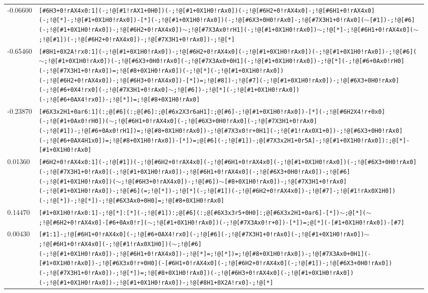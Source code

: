 \begin{longtable}{>{\baselineskip=10pt}p{} >{\baselineskip=10pt}p{}}
-0.06600 & \texttt{[\#6H3+0!rAX4x0:1](-;!@[\#1!rAX1+0H0])(-;!@[\#1+0X1H0!rAx0])(-;!@[\#6H2+0!rAX4x0]-;!@[\#6H1+0!rAX4x0](-;!@[*]-;!@[\#1+0X1H0!rAx0])-[*](-;!@[\#1+0X1H0!rAx0])(-;!@[\#6X3+0H0!rAx0]-;!@[\#7X3H1+0!rAx0]($\sim$[\#1])-;!@[\#6](-;!@[\#1+0X1H0!rAx0])-;!@[\#6H2+0!rAX4x0])$\sim$;!@[\#7X3Ax0!rH1](-;!@[\#1+0X1H0!rAx0])$\sim$;!@[*]-;!@[\#6H1+0!rAX4x0]($\sim$;!@[\#1])(-;!@[\#6H2+0!rAX4x0])-;!@[\#7X3H1+0!rAx0])-;!@[*]} \\ 
-0.65460 & \texttt{[\#8H1+0X2A!rx0:1](-;!@[\#1+0X1H0!rAx0])-;!@[\#6H2+0!rAX4x0](-;!@[\#1+0X1H0!rAx0])(-;!@[\#1+0X1H0!rAx0])-;!@[\#6]($\sim$;!@[\#1+0X1H0!rAx0])(-;!@[\#6X3+0H0!rAx0](-;!@[\#7X3Ax0+0H1](-;!@[\#1+0X1H0!rAx0])-;!@[*](-;!@[\#6+0Ax0!rH0](-;!@[\#7X3H1+0!rAx0])=;!@[\#8+0X1H0!rAx0])(-;!@[*](-;!@[\#1+0X1H0!rAx0])(-;!@[\#6H2+0!rAX4x0])-;!@[\#6H3+0!rAX4x0])-[*])=;!@[\#8])-;!@[\#7](-;!@[\#1+0X1H0!rAx0])-;!@[\#6X3+0H0!rAx0](-;!@[\#6+0X4!rx0](-;!@[\#7X3H1+0!rAx0]$\sim$;!@[\#6])-;!@[*](-;!@[\#1+0X1H0!rAx0])(-;!@[\#6+0AX4!rx0])-;!@[*])=;!@[\#8+0X1H0!rAx0]} \\ 
-0.23870 & \texttt{[\#6X3x2H1+0ar6:1](:;@[\#6](:;@[\#6]:;@[\#6x2X3r6aH1]:;@[\#6]-;!@[\#1+0X1H0!rAx0])-[*](-;!@[\#6H2X4!r+0x0](-;!@[\#1+0Ax0!rH0])($\sim$;!@[\#6H1+0!rAX4x0](-;!@[\#6X3+0H0!rAx0](-;!@[\#7X3H1+0!rAx0](-;!@[\#1])-;!@[\#6+0Ax0!rH1])=;!@[\#8+0X1H0!rAx0])-;!@[\#7X3x0!r+0H1](-;!@[\#1!rAx0X1+0])-;!@[\#6X3+0H0!rAx0](-;!@[\#6+0AX4H1x0])=;!@[\#8+0X1H0!rAx0])-[*])=;@[\#6](-;!@[\#1])-;@[\#7X3x2H1+0r5A]-;!@[\#1+0X1H0!rAx0]):;@[*]-[\#1+0X1H0!rAx0]} \\ 
0.01360 & \texttt{[\#6H2+0!rAX4x0:1](-;!@[\#1])(-;!@[\#6H2+0!rAX4x0](-;!@[\#6H1+0!rAX4x0](-;!@[\#1+0X1H0!rAx0])(-;!@[\#6X3+0H0!rAx0](-;!@[\#7X3H1+0!rAx0](-;!@[\#1+0X1H0!rAx0])-;!@[\#6H1+0!rAX4x0](-;!@[\#6X3+0H0!rAx0])-;!@[\#6](-;!@[\#1+0X1H0!rAx0])($\sim$;!@[\#6H3+0!rAX4x0])-;!@[\#6])$\sim$[\#8+0X1H0!rAx0])-;!@[\#7X3H1+0!rAx0](-;!@[\#1+0X1H0!rAx0])-;!@[\#6](=;!@[*])-;!@[*](-;!@[\#1])(-;!@[\#6H2+0!rAX4x0])-;!@[\#7]-;!@[\#1!rAx0X1H0])(-;!@[*])-;!@[*])-;!@[\#6X3Ax0+0H0]=;!@[\#8+0X1H0!rAx0]} \\ 
0.14470 & \texttt{[\#1+0X1H0!rAx0:1]-;!@[*]:[*](-;!@[\#1]):;@[\#6](:;@[\#6X3x3r5+0H0]:;@[\#6X3x2H1+0ar6]-[*])$\sim$;@[*]($\sim$;!@[\#6H2+0!rAX4x0]-[\#6+0Ax0!r]($\sim$;!@[\#1+0X1H0!rAx0])(-;!@[\#7X3Ax0!r+0])-[*])=;@[*](-[\#1+0X1H0!rAx0])-[\#7]} \\ 
0.00430 & \texttt{[\#1:1]-;!@[\#6H1+0!rAX4x0](-;!@[\#6+0AX4!rx0](-;!@[\#6](-;!@[\#7X3H1+0!rAx0](-;!@[\#1+0X1H0!rAx0])$\sim$;!@[\#6H1+0!rAX4x0](-;!@[\#1!rAx0X1H0])($\sim$;!@[\#6](-;!@[\#1+0X1H0!rAx0])-;!@[\#6H1+0!rAX4x0])-;!@[*]=;!@[*])=;!@[\#8+0X1H0!rAx0])-;!@[\#7X3Ax0+0H1](-[\#1+0X1H0!rAx0])-;!@[\#6X3x0!r+0H0](-[\#6H1+0!rAX4x0](-;!@[\#6H2+0!rAX4x0](-;!@[\#1])-;!@[\#6X3+0H0!rAx0])(-;!@[\#7X3H1+0!rAx0])-;!@[*])=;!@[\#8+0X1H0!rAx0])(-;!@[\#6H3+0!rAX4x0](-;!@[\#1+0X1H0!rAx0])(-;!@[\#1+0X1H0!rAx0])-;!@[\#1+0X1H0!rAx0])-;!@[\#8H1+0X2A!rx0]-;!@[*]} \\ 

\end{longtable}
